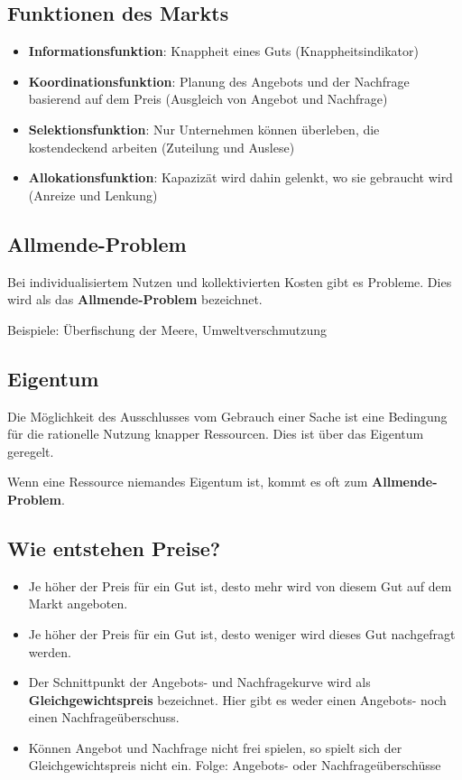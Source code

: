 \documentclass[titlepage,parskip=half]{scrartcl}
\begin{document}
\subsection{Funktionen des Markts}
\begin{itemize}
    \item \textbf{Informationsfunktion}: Knappheit eines Guts (Knappheitsindikator)
    \item \textbf{Koordinationsfunktion}: Planung des Angebots und der Nachfrage basierend auf dem Preis (Ausgleich von Angebot und Nachfrage)
    \item \textbf{Selektionsfunktion}: Nur Unternehmen können überleben, die kostendeckend arbeiten (Zuteilung und Auslese)
    \item \textbf{Allokationsfunktion}: Kapazizät wird dahin gelenkt, wo sie gebraucht wird (Anreize und Lenkung)
\end{itemize}

\subsection{Allmende-Problem}
Bei individualisiertem Nutzen und kollektivierten Kosten gibt es Probleme. Dies wird als das \textbf{Allmende-Problem} bezeichnet.

Beispiele: Überfischung der Meere, Umweltverschmutzung

\subsection{Eigentum}
Die Möglichkeit des Ausschlusses vom Gebrauch einer Sache ist eine Bedingung für die rationelle Nutzung knapper Ressourcen. Dies ist über das Eigentum geregelt.

Wenn eine Ressource niemandes Eigentum ist, kommt es oft zum \textbf{Allmende-Problem}.

\subsection{Wie entstehen Preise?}
\begin{itemize}
    \item Je höher der Preis für ein Gut ist, desto mehr wird von diesem Gut auf dem Markt angeboten.
    \item Je höher der Preis für ein Gut ist, desto weniger wird dieses Gut nachgefragt werden.
    \item Der Schnittpunkt der Angebots- und Nachfragekurve wird als \textbf{Gleichgewichtspreis} bezeichnet. Hier gibt es weder einen Angebots- noch einen Nachfrageüberschuss.
    \item Können Angebot und Nachfrage nicht frei spielen, so spielt sich der Gleichgewichtspreis nicht ein. Folge: Angebots- oder Nachfrageüberschüsse
\end{itemize}
\end{document}
